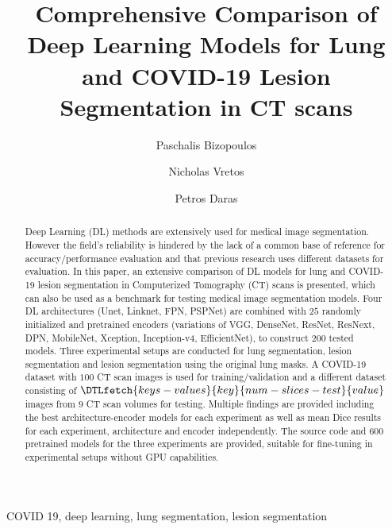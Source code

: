 \documentclass{elsarticle}
\begin{document}

\title{Comprehensive Comparison of Deep Learning Models for Lung and COVID-19 Lesion Segmentation in CT scans}
\author[1]{Paschalis Bizopoulos}
\author[1]{Nicholas Vretos}
\author[1]{Petros Daras}

\address[1]{Visual Computing Lab of the Information Technologies Institute, Centre for Research and Technology Hellas, Thessaloniki, Greece e-mail: pbizopoulos@protonmail.com,\{vretos,daras\}@iti.gr}

\begin{abstract}
	Deep Learning (DL) methods are extensively used for medical image segmentation.
	However the field's reliability is hindered by the lack of a common base of reference for accuracy/performance evaluation and that previous research uses different datasets for evaluation.
	In this paper, an extensive comparison of DL models for lung and COVID-19 lesion segmentation in Computerized Tomography (CT) scans is presented, which can also be used as a benchmark for testing medical image segmentation models.
	Four DL architectures (Unet, Linknet, FPN, PSPNet) are combined with $25$ randomly initialized and pretrained encoders (variations of VGG, DenseNet, ResNet, ResNext, DPN, MobileNet, Xception, Inception-v4, EfficientNet), to construct $200$ tested models.
	Three experimental setups are conducted for lung segmentation, lesion segmentation and lesion segmentation using the original lung masks.
	A COVID-19 dataset with $100$ CT scan images is used for training/validation and a different dataset consisting of $\DTLfetch{keys-values}{key}{num-slices-test}{value}$ images from $9$ CT scan volumes for testing.
	Multiple findings are provided including the best architecture-encoder models for each experiment as well as mean Dice results for each experiment, architecture and encoder independently.
	The source code and $600$ pretrained models for the three experiments are provided, suitable for fine-tuning in experimental setups without GPU capabilities.
\end{abstract}

\begin{keyword}
	COVID 19, deep learning, lung segmentation, lesion segmentation
\end{keyword}

\maketitle
\end{document}
